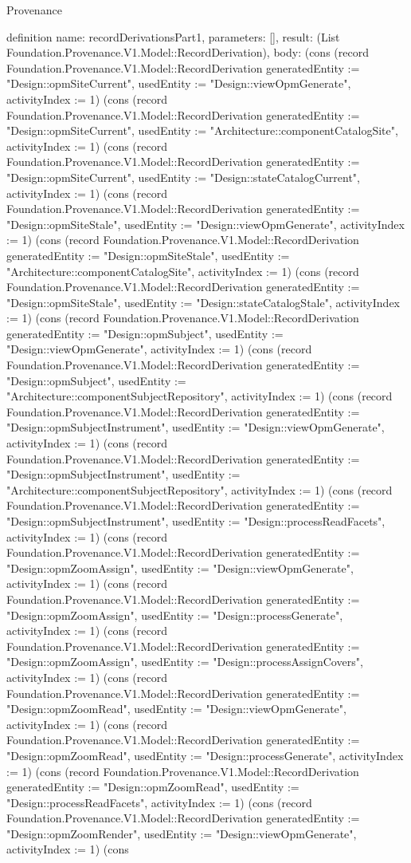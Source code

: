 \begin{lexlean}{Provenance}
\begin{semanticmodule}
definition{
  name: recordDerivationsPart1,
  parameters: [],
  result: (List Foundation.Provenance.V1.Model::RecordDerivation),
  body: (cons (record Foundation.Provenance.V1.Model::RecordDerivation {generatedEntity := "Design::opmSiteCurrent", usedEntity := "Design::viewOpmGenerate", activityIndex := 1}) (cons (record Foundation.Provenance.V1.Model::RecordDerivation {generatedEntity := "Design::opmSiteCurrent", usedEntity := "Architecture::componentCatalogSite", activityIndex := 1}) (cons (record Foundation.Provenance.V1.Model::RecordDerivation {generatedEntity := "Design::opmSiteCurrent", usedEntity := "Design::stateCatalogCurrent", activityIndex := 1}) (cons (record Foundation.Provenance.V1.Model::RecordDerivation {generatedEntity := "Design::opmSiteStale", usedEntity := "Design::viewOpmGenerate", activityIndex := 1}) (cons (record Foundation.Provenance.V1.Model::RecordDerivation {generatedEntity := "Design::opmSiteStale", usedEntity := "Architecture::componentCatalogSite", activityIndex := 1}) (cons (record Foundation.Provenance.V1.Model::RecordDerivation {generatedEntity := "Design::opmSiteStale", usedEntity := "Design::stateCatalogStale", activityIndex := 1}) (cons (record Foundation.Provenance.V1.Model::RecordDerivation {generatedEntity := "Design::opmSubject", usedEntity := "Design::viewOpmGenerate", activityIndex := 1}) (cons (record Foundation.Provenance.V1.Model::RecordDerivation {generatedEntity := "Design::opmSubject", usedEntity := "Architecture::componentSubjectRepository", activityIndex := 1}) (cons (record Foundation.Provenance.V1.Model::RecordDerivation {generatedEntity := "Design::opmSubjectInstrument", usedEntity := "Design::viewOpmGenerate", activityIndex := 1}) (cons (record Foundation.Provenance.V1.Model::RecordDerivation {generatedEntity := "Design::opmSubjectInstrument", usedEntity := "Architecture::componentSubjectRepository", activityIndex := 1}) (cons (record Foundation.Provenance.V1.Model::RecordDerivation {generatedEntity := "Design::opmSubjectInstrument", usedEntity := "Design::processReadFacets", activityIndex := 1}) (cons (record Foundation.Provenance.V1.Model::RecordDerivation {generatedEntity := "Design::opmZoomAssign", usedEntity := "Design::viewOpmGenerate", activityIndex := 1}) (cons (record Foundation.Provenance.V1.Model::RecordDerivation {generatedEntity := "Design::opmZoomAssign", usedEntity := "Design::processGenerate", activityIndex := 1}) (cons (record Foundation.Provenance.V1.Model::RecordDerivation {generatedEntity := "Design::opmZoomAssign", usedEntity := "Design::processAssignCovers", activityIndex := 1}) (cons (record Foundation.Provenance.V1.Model::RecordDerivation {generatedEntity := "Design::opmZoomRead", usedEntity := "Design::viewOpmGenerate", activityIndex := 1}) (cons (record Foundation.Provenance.V1.Model::RecordDerivation {generatedEntity := "Design::opmZoomRead", usedEntity := "Design::processGenerate", activityIndex := 1}) (cons (record Foundation.Provenance.V1.Model::RecordDerivation {generatedEntity := "Design::opmZoomRead", usedEntity := "Design::processReadFacets", activityIndex := 1}) (cons (record Foundation.Provenance.V1.Model::RecordDerivation {generatedEntity := "Design::opmZoomRender", usedEntity := "Design::viewOpmGenerate", activityIndex := 1}) (cons }
\end{semanticmodule}
\end{lexlean}
